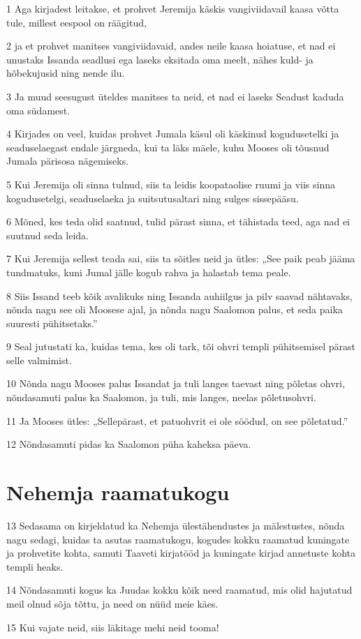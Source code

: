 \par 1 Aga kirjadest leitakse, et prohvet Jeremija käskis vangiviidavail kaasa võtta tule, millest eespool on räägitud,
\par 2 ja et prohvet manitses vangiviidavaid, andes neile kaasa hoiatuse, et nad ei unustaks Issanda seadlusi ega laseks eksitada oma meelt, nähes kuld- ja hõbekujusid ning nende ilu.
\par 3 Ja muud seesugust üteldes manitses ta neid, et nad ei laseks Seadust kaduda oma südamest.
\par 4 Kirjades on veel, kuidas prohvet Jumala käsul oli käskinud kogudusetelki ja seaduselaegast endale järgneda, kui ta läks mäele, kuhu Mooses oli tõusnud Jumala pärisosa nägemiseks.
\par 5 Kui Jeremija oli sinna tulnud, siis ta leidis koopataolise ruumi ja viis sinna kogudusetelgi, seaduselaeka ja suitsutusaltari ning sulges sissepääsu.
\par 6 Mõned, kes teda olid saatnud, tulid pärast sinna, et tähistada teed, aga nad ei suutnud seda leida.
\par 7 Kui Jeremija sellest teada sai, siis ta sõitles neid ja ütles: „See paik peab jääma tundmatuks, kuni Jumal jälle kogub rahva ja halastab tema peale.
\par 8 Siis Issand teeb kõik avalikuks ning Issanda auhiilgus ja pilv saavad nähtavaks, nõnda nagu see oli Moosese ajal, ja nõnda nagu Saalomon palus, et seda paika suuresti pühitsetaks.”
\par 9 Seal jutustati ka, kuidas tema, kes oli tark, tõi ohvri templi pühitsemisel pärast selle valmimist.
\par 10 Nõnda nagu Mooses palus Issandat ja tuli langes taevast ning põletas ohvri, nõndasamuti palus ka Saalomon, ja tuli, mis langes, neelas põletusohvri.
\par 11 Ja Mooses ütles: „Sellepärast, et patuohvrit ei ole söödud, on see põletatud.”
\par 12 Nõndasamuti pidas ka Saalomon püha kaheksa päeva.


\section*{Nehemja raamatukogu}

\par 13 Sedasama on kirjeldatud ka Nehemja ülestähendustes ja mälestustes, nõnda nagu sedagi, kuidas ta asutas raamatukogu, kogudes kokku raamatud kuningate ja prohvetite kohta, samuti Taaveti kirjatööd ja kuningate kirjad annetuste kohta templi heaks.
\par 14 Nõndasamuti kogus ka Juudas kokku kõik need raamatud, mis olid hajutatud meil olnud sõja tõttu, ja need on nüüd meie käes.
\par 15 Kui vajate neid, siis läkitage mehi neid tooma!


